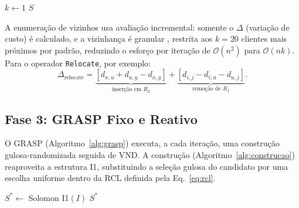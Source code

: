 \documentclass[10pt, a4paper]{article}
\begin{document}
\begin{algorithm}[H]
\caption{VND --- Variable Neighborhood Descent}
\label{alg:vnd}
$k \leftarrow 1$\;
\Return $S$\;
\end{algorithm}

A enumera\c{c}\~ao de vizinhos usa avalia\c{c}\~ao incremental: somente o $\Delta$ (varia\c{c}\~ao de custo) \'e calculado, e a vizinhan\c{c}a \'e granular \citep{toth2003}, restrita aos $k=20$ clientes mais pr\'oximos por padr\~ao, reduzindo o esfor\c{c}o por itera\c{c}\~ao de $\mathcal{O}(n^2)$ para $\mathcal{O}(n k)$. Para o operador \texttt{Relocate}, por exemplo:
\begin{equation}
\Delta_\text{relocate} = \underbrace{[d_{x,u} + d_{u,y} - d_{x,y}]}_{\text{inser\c{c}\~ao em }R_2} + \underbrace{[d_{i,j} - d_{i,u} - d_{u,j}]}_{\text{remo\c{c}\~ao de }R_1}.
\label{eq:delta-relocate}
\end{equation}

\subsection{Fase 3: GRASP Fixo e Reativo}
\label{sec-grasp}

O GRASP (Algoritmo~\ref{alg:grasp}) executa, a cada itera\c{c}\~ao, uma constru\c{c}\~ao gulosa-randomizada seguida de VND. A constru\c{c}\~ao (Algoritmo~\ref{alg:construcao}) reaproveita a estrutura I1, substituindo a sele\c{c}\~ao gulosa do candidato por uma escolha uniforme dentro da RCL definida pela Eq.~\ref{eq:rcl}.

\begin{algorithm}[H]
\caption{GRASP (fixo e reativo) com VND como busca local}
\label{alg:grasp}
$S^* \leftarrow$ Solomon I1$(I)$
\Return $S^*$\;
\end{algorithm}
\end{document}
